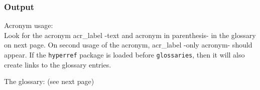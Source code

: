 \subsubsection{Output}

Acronym usage:\\
Look for the acronym \gls{acr_label} -text and acronym
in parenthesis- in the glossary on next page. On
second usage of the acronym, \gls{acr_label} -only
acronym- should appear. If the \texttt{hyperref}
package is loaded before \texttt{glossaries},
then it will also create links to the glossary entries.


The glossary: (see next page)
\printglossary



\cite{greenwade93}
\nocite{goossens93}
